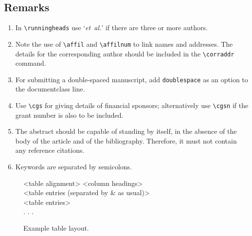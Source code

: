 \documentclass[times]{weauth}
\begin{document}
\subsection{Remarks}
\begin{enumerate}
\item[(i)] In \verb"\runningheads" use `\emph{et~al.}' if there
are three or more authors.

\item[(ii)] Note the use of \verb"\affil" and \verb"\affilnum" to
link names and addresses. The details for the corresponding
author should be included in the \verb"\corraddr" command.

\item[(iii)] For submitting a double-spaced manuscript, add
\verb"doublespace" as an option to the documentclass line.

\item[(iv)] Use \verb"\cgs" for giving details of financial
sponsors; alternatively use \verb"\cgsn" if the grant number is
also to be included.

\item[(v)] The abstract should be capable of standing by itself,
in the absence of the body of the article and of the bibliography.
Therefore, it must not contain any reference citations.

\item[(vi)] Keywords are separated by semicolons.
\end{enumerate}

\begin{figure}
\setlength{\fboxsep}{0pt}%
\setlength{\fboxrule}{0pt}%
\begin{center}
\begin{boxedverbatim}
\begin{table}
\caption{<Table caption>}
\centering
\small
\begin{tabular}{<table alignment>}
\toprule
<column headings>\\
\midrule
<table entries
(separated by & as usual)>\\
<table entries>\\
.
.
.\\
\bottomrule
\end{tabular}
\end{table}
\end{boxedverbatim}
\end{center}
\caption{Example table layout.\label{F2}}
\end{figure}
\end{document}
